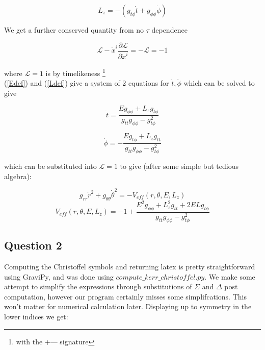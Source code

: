 \documentclass[10pt,a4paper]{report}
\begin{document}
\begin{equation}
L_z = - ( g_{t\phi}\dot{t}+g_{\phi\phi}\dot{\phi})
\label{Ldef}
\end{equation}

We get a further conserved quantity from no $\tau$ dependence

\begin{equation}
\mathcal{L} - \dot{x}^i \frac{\partial \mathcal{L}}{\partial \dot{x}^i} = -\mathcal{L} = -1
\label{Qdef}
\end{equation}

where $\mathcal{L} = 1$ is by timelikeness \footnote{with the +--- signature} \\

(\ref{Edef}) and (\ref{Ldef}) give a system of 2 equations for $\dot{t}, \dot{\phi}$ which can be solved to give

\begin{equation}
\dot{t} = \frac{Eg_{\phi\phi}+L_zg_{t\phi}}{g_{tt}g_{\phi\phi}-g_{t\phi}^2}
\label{tdef}
\end{equation}

\begin{equation}
\dot{\phi} = -\frac{Eg_{t\phi}+L_zg_{tt}}{g_{tt}g_{\phi\phi}-g_{t\phi}^2}
\label{phidef}
\end{equation}

which can be substituted into $\mathcal{L}=1$  to give (after some simple but tedious algebra): 

\begin{equation}
g_{rr}\dot{r}^2+g_{\theta\theta}\dot{\theta}^2 = -V_{eff}(r, \theta, E, L_z)
\label{effpot}
\end{equation}
\begin{equation*}
V_{eff}(r, \theta, E, L_z) = -1 + \frac{E^2g_{\phi\phi} + L_z^2g_{tt} + 2ELg_{t\phi}}{g_{tt}g_{\phi\phi}-g_{t\phi}^2}
\end{equation*}

\subsection*{Question 2}
Computing the Christoffel symbols and returning latex is pretty straightforward using GraviPy, and was done using $compute\_kerr\_christoffel.py$. We make some attempt to simplify the expressions through substitutions of $\Sigma$ and $\Delta$ post computation, however our program certainly misses some simplifcations. This won't matter for numerical calculation later. Displaying up to symmetry in the lower indices we get: \\
\end{document}
